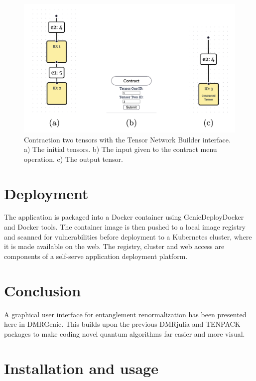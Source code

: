 \documentclass{juliacon}
\begin{document}
\begin{figure}
    \includegraphics[width=\columnwidth]{contraction.png}
\caption{Contraction two tensors with the Tensor Network Builder interface. a) The initial tensors. b) The input given to the contract menu operation. c) The output tensor. } \label{GUIcontraction}
\end{figure}

\section{Deployment}

The application is packaged into a Docker container using GenieDeployDocker and Docker tools.  The container image is then pushed to a local image registry and scanned for vulnerabilities before deployment to a Kubernetes cluster, where it is made available on the web.  The registry,  cluster and web access are components of a self-serve application deployment platform.

\section{Conclusion}

A graphical user interface for entanglement renormalization has been presented here in DMRGenie. This builds upon the previous DMRjulia and TENPACK packages to make coding novel quantum algorithms far easier and more visual. 

\section{Installation and usage}
\end{document}
